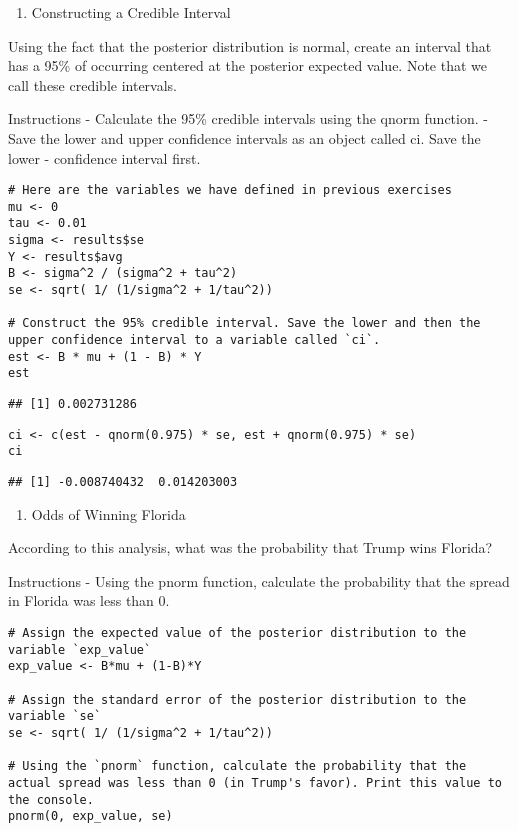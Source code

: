 \documentclass[
]{article}
\providecommand{\tightlist}{%
  \setlength{\itemsep}{0pt}\setlength{\parskip}{0pt}}
\begin{document}
\begin{enumerate}
\def\labelenumi{\arabic{enumi}.}
\setcounter{enumi}{9}
\tightlist
\item
  Constructing a Credible Interval
\end{enumerate}

Using the fact that the posterior distribution is normal, create an
interval that has a 95\% of occurring centered at the posterior expected
value. Note that we call these credible intervals.

Instructions - Calculate the 95\% credible intervals using the qnorm
function. - Save the lower and upper confidence intervals as an object
called ci. Save the lower - confidence interval first.

\begin{verbatim}
# Here are the variables we have defined in previous exercises
mu <- 0
tau <- 0.01
sigma <- results$se
Y <- results$avg
B <- sigma^2 / (sigma^2 + tau^2)
se <- sqrt( 1/ (1/sigma^2 + 1/tau^2))

# Construct the 95% credible interval. Save the lower and then the upper confidence interval to a variable called `ci`.
est <- B * mu + (1 - B) * Y
est
\end{verbatim}

\begin{verbatim}
## [1] 0.002731286
\end{verbatim}

\begin{verbatim}
ci <- c(est - qnorm(0.975) * se, est + qnorm(0.975) * se)
ci
\end{verbatim}

\begin{verbatim}
## [1] -0.008740432  0.014203003
\end{verbatim}

\begin{enumerate}
\def\labelenumi{\arabic{enumi}.}
\setcounter{enumi}{10}
\tightlist
\item
  Odds of Winning Florida
\end{enumerate}

According to this analysis, what was the probability that Trump wins
Florida?

Instructions - Using the pnorm function, calculate the probability that
the spread in Florida was less than 0.

\begin{verbatim}
# Assign the expected value of the posterior distribution to the variable `exp_value`
exp_value <- B*mu + (1-B)*Y 

# Assign the standard error of the posterior distribution to the variable `se`
se <- sqrt( 1/ (1/sigma^2 + 1/tau^2))

# Using the `pnorm` function, calculate the probability that the actual spread was less than 0 (in Trump's favor). Print this value to the console.
pnorm(0, exp_value, se)
\end{verbatim}
\end{document}
